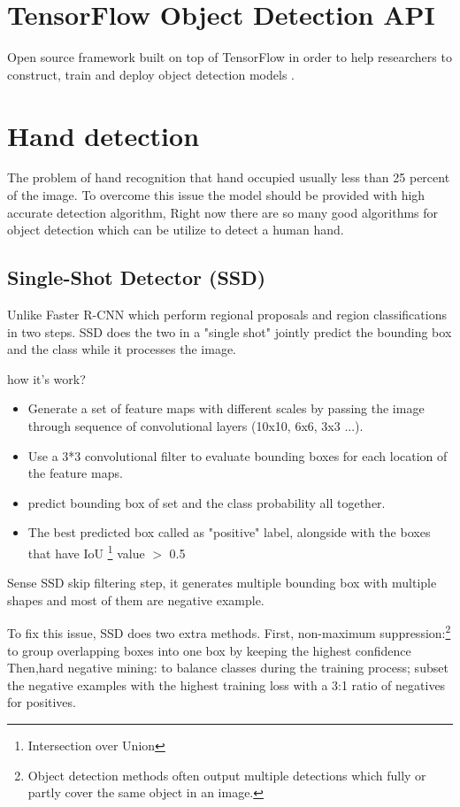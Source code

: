 \documentclass[12pt]{report}
\begin{document}
\section{TensorFlow Object Detection API}
Open source framework built on top of TensorFlow in order to help 
researchers to construct, train and deploy object detection models \cite{tf_od_api}. 

\section{Hand detection}

The problem of hand recognition that hand occupied usually less than 25 percent of the image.
To overcome this issue the model should be provided with high accurate detection algorithm,
Right now there are so many good algorithms for object detection which can be utilize to 
detect a human hand.

\subsection{Single-Shot Detector (SSD)}

Unlike Faster R-CNN which perform regional proposals 
and region classifications in two steps. SSD does the two in a "single shot"
jointly predict the bounding box and the class while it processes the image.

how it's work?
\begin{itemize}
    \item Generate a set of feature maps with different scales by passing 
    the image through sequence of convolutional layers (10x10, 6x6, 3x3 ...).
    \item Use a 3*3 convolutional filter to evaluate bounding boxes for each 
    location of the feature maps.
    \item predict bounding box of set and the class probability all together.
    \item The best predicted box called as "positive" label, alongside with
    the boxes that have IoU \footnote{Intersection over Union } value $>$ 0.5 
\end{itemize}
Sense SSD skip filtering step, it generates multiple bounding box with multiple shapes
and most of them are negative example.

To fix this issue, SSD does two extra methods.
First, non-maximum suppression:\footnote{Object detection methods often output 
multiple detections which fully or partly cover the same object in an image.}
to group overlapping boxes into one box by keeping the highest confidence
Then,hard negative mining: to balance classes during the training process; 
subset the negative examples with the highest training loss with a 3:1 ratio 
of negatives for positives.\cite{Liu2016}
\end{document}

